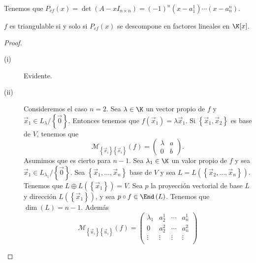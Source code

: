 \begin{observation}
\normalfont Tenemos que $\displaystyle P_{cf}\left(x\right) = \det\left(A - x I_{n \times n}\right)= \left(-1\right)^{n}\left(x - a^{1}_{1}\right) \cdots \left(x- a^{n}_{n}\right) $.
\end{observation}
\begin{ftheorem}[]
	\normalfont $\displaystyle f $ es triangulable si y solo si $\displaystyle P_{cf}\left(x\right) $ se descompone en factores lineales en $\displaystyle \K[x] $.
\end{ftheorem}
\begin{proof}
\begin{description}
\item[(i)] Evidente.
\item[(ii)] Consideremos el caso $\displaystyle n = 2 $. Sea $\displaystyle \lambda \in \K $ un vector propio de $\displaystyle f $ y $\displaystyle \vec{x}_{1} \in L_{\lambda }/ \left\{ \vec{0}\right\}  $. Entonces tenemos que $\displaystyle f\left(\vec{x}_{1}\right) = \lambda\vec{x}_{1} $. Si $\displaystyle \left\{ \vec{x}_{1}, \vec{x}_{2}\right\}  $ es base de $\displaystyle V $, tenemos que
	\[\mathcal{M}_{ \left\{ \vec{x}_{i}\right\} \left\{ \vec{x}_{i}\right\} }\left(f\right) = \begin{pmatrix} \lambda & a \\
	0 & b\end{pmatrix} .\]
	Asumimos que es cierto para $\displaystyle n - 1 $. Sea $\displaystyle \lambda_{1} \in \K $ un valor propio de $\displaystyle f $ y sea $\displaystyle \vec{x}_{1} \in L_{\lambda_{1}} / \left\{ \vec{0}\right\}  $. Sea $\displaystyle \left\{ \vec{x}_{1}, \ldots, \vec{ x}_{n}\right\}  $ base de $\displaystyle V $ y sea $\displaystyle L = L\left( \left\{ \vec{x}_{2}, \ldots, \vec{x}_{n}\right\} \right) $. Tenemos que $\displaystyle L \oplus L\left( \left\{ \vec{x}_{1}\right\} \right) = V $. 
	Sea $\displaystyle p $ la proyección vectorial de base $\displaystyle L $ y dirección $\displaystyle L\left( \left\{ \vec{x}_{1}\right\} \right) $, y sea $\displaystyle p \circ f \in \End\left(L\right) $. Tenemos que $\displaystyle \dim\left(L\right) = n - 1 $. Además 
		\[\mathcal{M}_{ \left\{ \vec{u}_{i}\right\} \left\{ \vec{u}_{i}\right\} }\left(f\right) = \begin{pmatrix} \lambda _{1} & a^{1}_{2} & \cdots & a^{1}_{n} \\
		0 & a^{2}_{2} & \cdots & a^{2}_{n} \\
	\vdots & \vdots & \vdots & \vdots\\

\end{pmatrix}\]
\end{description}
\end{proof}
